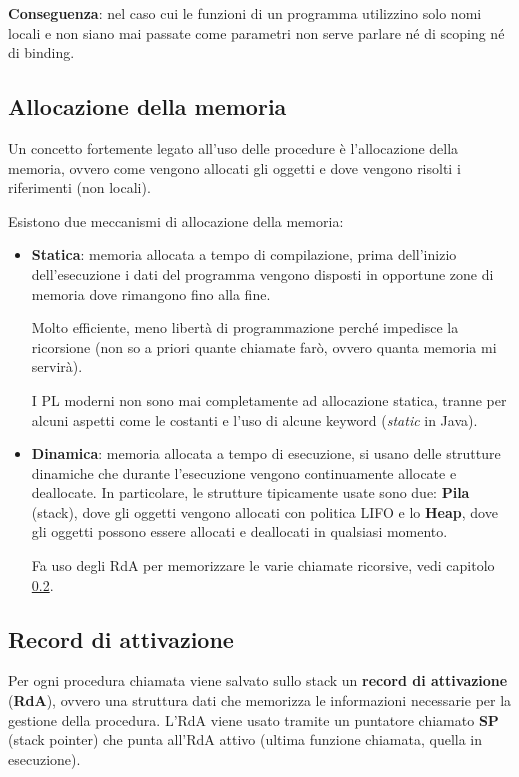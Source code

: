 \documentclass[12pt,a4paper]{article}
\begin{document}
\textbf{Conseguenza}: nel caso cui le funzioni di un programma utilizzino solo nomi locali e non siano mai passate come parametri non serve parlare né di scoping né di binding.

\subsection{Allocazione della memoria}
Un concetto fortemente legato all’uso delle procedure è l’allocazione della memoria, ovvero come vengono allocati gli oggetti e dove vengono risolti i riferimenti (non locali).

Esistono due meccanismi di allocazione della memoria:
\begin{itemize}
\item \textbf{Statica}: memoria allocata a tempo di compilazione, prima dell'inizio dell'esecuzione  i dati del programma vengono disposti in opportune zone di memoria dove rimangono fino alla fine.

Molto efficiente, meno libertà di programmazione perché impedisce la ricorsione (non so a priori quante chiamate farò, ovvero quanta memoria mi servirà).

I PL moderni non sono mai completamente ad allocazione statica, tranne per alcuni aspetti come le costanti e l'uso di alcune keyword (\textit{static} in Java).

\item \textbf{Dinamica}: memoria allocata a tempo di esecuzione, si usano delle strutture dinamiche che durante l'esecuzione vengono continuamente allocate e deallocate. In particolare, le strutture tipicamente usate sono due: \textbf{Pila} (stack), dove gli oggetti vengono allocati con politica LIFO e lo \textbf{Heap}, dove gli oggetti possono essere allocati e deallocati in qualsiasi momento.

Fa uso degli RdA per memorizzare le varie chiamate ricorsive, vedi capitolo \ref{RdA}.
\end{itemize}
\subsection{Record di attivazione}\label{RdA}
Per ogni procedura chiamata viene salvato sullo stack un \textbf{record di attivazione} (\textbf{RdA}), ovvero una struttura dati che memorizza le informazioni necessarie per la gestione della procedura. L'RdA viene usato tramite un puntatore chiamato \textbf{SP} (stack pointer) che punta all'RdA attivo (ultima funzione chiamata, quella in esecuzione). 
\end{document}
